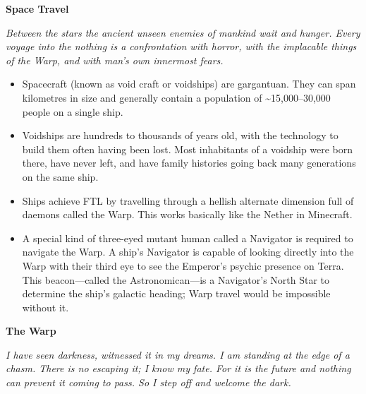 \documentclass[10pt,a4paper]{article}
\newcommand{\rpgsection}[1]{%
  \vspace{0.8em}%
  {\headerfont\bfseries\Large #1}\par%
  \vspace{0.5em}%
}
\begin{document}
\begin{multicols}{2}
\rpgsection{Space Travel}
\textit{Between the stars the ancient unseen enemies of mankind wait and hunger. Every voyage into the nothing is a confrontation with horror, with the implacable things of the Warp, and with man's own innermost fears.}

\begin{itemize}
  \item Spacecraft (known as void craft or voidships) are gargantuan. They can span kilometres in size and generally contain a population of \textasciitilde15,000–30,000 people on a single ship.
  \item Voidships are hundreds to thousands of years old, with the technology to build them often having been lost. Most inhabitants of a voidship were born there, have never left, and have family histories going back many generations on the same ship.
  \item Ships achieve FTL by travelling through a hellish alternate dimension full of daemons called the Warp. This works basically like the Nether in Minecraft.
  \item A special kind of three-eyed mutant human called a Navigator is required to navigate the Warp. A ship’s Navigator is capable of looking directly into the Warp with their third eye to see the Emperor’s psychic presence on Terra. This beacon—called the Astronomican—is a Navigator's North Star to determine the ship’s galactic heading; Warp travel would be impossible without it.
\end{itemize}

\rpgsection{The Warp}
\textit{I have seen darkness, witnessed it in my dreams. I am standing at the edge of a chasm. There is no escaping it; I know my fate. For it is the future and nothing can prevent it coming to pass. So I step off and welcome the dark.}


\end{multicols}
\end{document}
